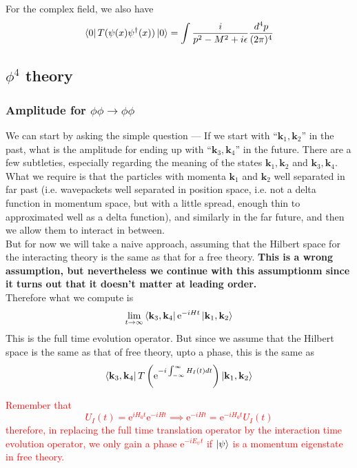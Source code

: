 \documentclass[11pt, notitlepage]{report}
\newcommand{\e}{\mathrm{e}}
\numberwithin{equation}{section}
\begin{document}
    For the complex field, we also have 
    \begin{equation*}
        \bra{0} T ( \psi(x) \psi^\dagger(x) )\ket{0} = \int \frac{i}{p^2 - M^2 + i\epsilon} \frac{d^4p}{(2\pi)^4}
    \end{equation*}

    \subsection{\(\phi^4\) theory}
    \subsubsection{Amplitude for \(\phi\phi \to \phi\phi\)}
    We can start by asking the simple question — If we start with ``\(\textbf{k}_1,\textbf{k}_2\)'' in the past, what is the amplitude for ending up with ``\(\textbf{k}_3, \textbf{k}_4\)'' in the future. There are a few subtleties, especially regarding the meaning of the states \(\textbf{k}_1,\textbf{k}_2\) and \(\textbf{k}_3, \textbf{k}_4\). What we require is that the particles with momenta \(\textbf{k}_1\) and \(\textbf{k}_2\) well separated in far past (i.e. wavepackets well separated in position space, i.e. not a delta function in momentum space, but with a little spread, enough thin to approximated well as a delta function), and similarly in the far future, and then we allow them to interact in between. \\
    But for now we will take a naive approach, assuming that the Hilbert space for the interacting theory is the same as that for a free theory. \textbf{This is a wrong assumption, but nevertheless we continue with this assumptionm since it turns out that it doesn't matter at leading order.}\\ 
    Therefore what we compute is 
    \begin{equation*}
        \lim_{t\to \infty}\bra{\textbf{k}_3, \textbf{k}_4} \e^{-iHt} \ket{\textbf{k}_1, \textbf{k}_2}
    \end{equation*}
    This is the full time evolution operator. But since we assume that the Hilbert space is the same as that of free theory, upto a phase, this is the same as 
    \begin{equation*}
        \bra{\textbf{k}_3, \textbf{k}_4} T\left(\e^{-i\int_{-\infty}^{\infty}H_I(t) dt }\right) \ket{\textbf{k}_1, \textbf{k}_2}
    \end{equation*}

    \textcolor{red}{
    Remember that 
    \begin{equation*}
        U_I(t) = \e^{iH_0t }\e^{-iHt} \implies \e^{-iHt} = \e^{-iH_0t} U_I(t)
    \end{equation*}
    therefore, in replacing the full time translation operator by the interaction time evolution operator, we only gain a phase \(\e^{-iE_\psi t}\) if \(\ket{\psi}\) is a momentum eigenstate in free theory.\\
    }
\end{document}
